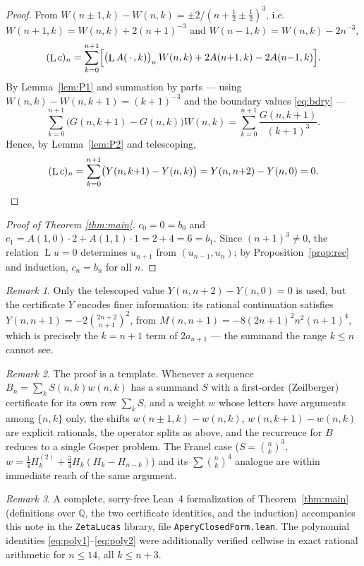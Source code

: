 \documentclass[11pt]{article}
\theoremstyle{remark}
\newtheorem{remark}{Remark}
\newcommand{\QQ}{\mathbb{Q}}
\DeclareMathOperator{\Lop}{L}
\begin{document}
\begin{proof}
From $W(n\pm1,k)-W(n,k)=\pm2/(n{+}\tfrac12\pm\tfrac12)^{3}$, i.e.
$W(n{+}1,k)=W(n,k)+2(n{+}1)^{-3}$ and $W(n{-}1,k)=W(n,k)-2n^{-3}$,
\[
(\Lop c)_n=\sum_{k=0}^{n+1}
\Bigl[\bigl(\Lop A(\,\cdot\,,k)\bigr)_n\,W(n,k)
+2A(n{+}1,k)-2A(n{-}1,k)\Bigr].
\]
By Lemma~\ref{lem:P1} and summation by parts --- using
$W(n,k)-W(n,k+1)=(k+1)^{-3}$ and the boundary values \eqref{eq:bdry} ---
\[
\sum_{k=0}^{n+1}\bigl(G(n,k{+}1)-G(n,k)\bigr)W(n,k)
=\sum_{k=0}^{n+1}\frac{G(n,k{+}1)}{(k+1)^{3}} .
\]
Hence, by Lemma~\ref{lem:P2} and telescoping,
\[
(\Lop c)_n=\sum_{k=0}^{n+1}\bigl(Y(n,k{+}1)-Y(n,k)\bigr)
=Y(n,n{+}2)-Y(n,0)=0. \qedhere
\]
\end{proof}

\begin{proof}[Proof of Theorem \ref{thm:main}]
$c_0=0=b_0$ and $c_1=A(1,0)\cdot2+A(1,1)\cdot1=2+4=6=b_1$. Since
$(n+1)^{3}\neq0$, the relation $\Lop u=0$ determines $u_{n+1}$ from
$(u_{n-1},u_n)$; by Proposition~\ref{prop:rec} and induction, $c_n=b_n$ for
all $n$.
\end{proof}

\begin{remark}
Only the telescoped value $Y(n,n+2)-Y(n,0)=0$ is used, but the certificate
$Y$ encodes finer information: its rational continuation satisfies
$Y(n,n+1)=-2\binom{2n+2}{n+1}^{2}$, from
$M(n,n{+}1)=-8(2n{+}1)^{2}n^{2}(n{+}1)^{4}$, which is precisely the
$k=n{+}1$ term of $2a_{n+1}$ --- the summand the range $k\le n$ cannot see.
\end{remark}

\begin{remark}
The proof is a template. Whenever a sequence $B_n=\sum_kS(n,k)w(n,k)$ has a
summand $S$ with a first-order (Zeilberger) certificate for its own row
$\sum_kS$, and a weight $w$ whose letters have arguments among $\{n,k\}$
only, the shifts $w(n\pm1,k)-w(n,k)$, $w(n,k+1)-w(n,k)$ are explicit
rationals, the operator splits as above, and the recurrence for $B$ reduces
to a single Gosper problem. The Franel case
($S=\binom{n}{k}^{3}$, $w=\tfrac14H^{(2)}_k+\tfrac34H_k(H_k-H_{n-k})$) and
its $\sum\binom{n}{k}^{4}$ analogue are within immediate reach of the same
argument.
\end{remark}

\begin{remark}
A complete, sorry-free Lean~4 formalization of Theorem~\ref{thm:main}
(definitions over $\QQ$, the two certificate identities, and the induction)
accompanies this note in the \texttt{ZetaLucas} library, file
\texttt{AperyClosedForm.lean}. The polynomial identities
\eqref{eq:poly1}--\eqref{eq:poly2} were additionally verified cellwise in
exact rational arithmetic for $n\le14$, all $k\le n+3$.
\end{remark}
\end{document}
